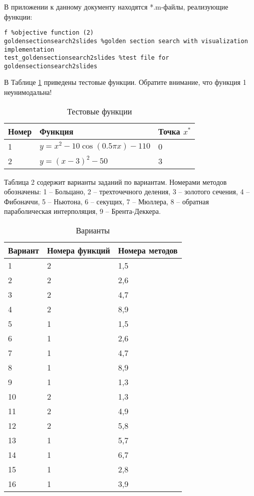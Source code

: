 \documentclass[a4paper,12pt]{article}
\begin{document}
В приложении к данному документу находятся *.m-файлы, реализующие функции:
\begin{lstlisting}[style=Matlab-editor] 
f %objective function (2)
goldensectionsearch2slides %golden section search with visualization implementation
test_goldensectionsearch2slides %test file for goldensectionsearch2slides
\end{lstlisting}


В Таблице \ref{tab:1} приведены тестовые функции. Обратите внимание, что функция 1 неунимодальна!
\begin{table}
  \centering
    \begin{tabular}{| l | l | l |}
    \hline
     Номер & Функция & Точка $x^*$ \\ \hline
     1 & $y = x^2  -  10 \cos(0.5 \pi x) - 110$ & 0\\ \hline
     2 & $y = (x - 3)^2 - 50$  & 3 \\ \hline
     \end{tabular}
    \caption{Тестовые функции}
    \label{tab:1}
\end{table}

Таблица 2 содержит варианты заданий по вариантам. Номерами методов обозначены: 1 -- Больцано, 2 -- трехточечного деления, 3 -- золотого сечения, 4 -- Фибоначчи, 5 -- Ньютона, 6 -- секущих, 7 -- Мюллера, 8 -- обратная параболическая интерполяция, 9 -- Брента-Деккера.

\begin{table}
  \centering
    \begin{tabular}{| l | l | l |}
    \hline
     Вариант & Номера функций & Номера методов \\ \hline
      1 & 2& 1,5\\ \hline
	2 & 2 & 2,6\\ \hline
	3 & 2 & 4,7\\ \hline
	4 & 2 & 8,9\\ \hline
	5 & 1& 1,5\\ \hline
	6 & 1 & 2,6\\ \hline
	7 & 1 & 4,7\\ \hline
	8 & 1 & 8,9\\ \hline
	9 & 1 & 1,3\\ \hline
	10 & 2 & 1,3\\ \hline
	11 & 2 & 4,9\\ \hline
	12 & 2 & 5,8\\ \hline
	13 & 1 & 5,7\\ \hline
	14 & 1 & 6,7\\ \hline
	15 & 1 & 2,8\\ \hline
	16 & 1 & 3,9\\ \hline
     \end{tabular}
    \caption{Варианты}
    \label{tab:2}
\end{table}
\end{document}
